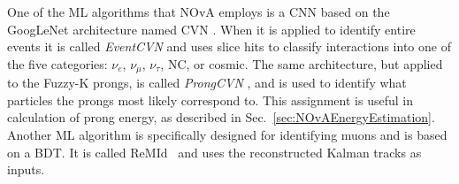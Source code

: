 One of the \gls{ML} algorithms that NOvA employs is a \gls{CNN} based on the GoogLeNet \cite{GoogLeNetArchitecture.pdf} architecture named \gls{CVN} \cite{CVN.pdf}. When it is applied to identify entire events it is called \textit{EventCVN} and uses slice hits to classify interactions into one of the five categories: $\nu_e$, $\nu_\mu$, $\nu_\tau$, \gls{NC}, or cosmic. The same architecture, but applied to the Fuzzy-K prongs, is called \textit{ProngCVN} \cite{PsihasNOvAThesis_ProngCVN.pdf}, and is used to identify what particles the prongs most likely correspond to. This assignment is useful in calculation of prong energy, as described in Sec.~\ref{sec:NOvAEnergyEstimation}. Another \gls{ML} algorithm is specifically designed for identifying muons and is based on a \gls{BDT}. It is called \gls{ReMId}~\cite{RaddatzNOvAThesis_KalmanTracks.pdf} and uses the reconstructed Kalman tracks as inputs.



